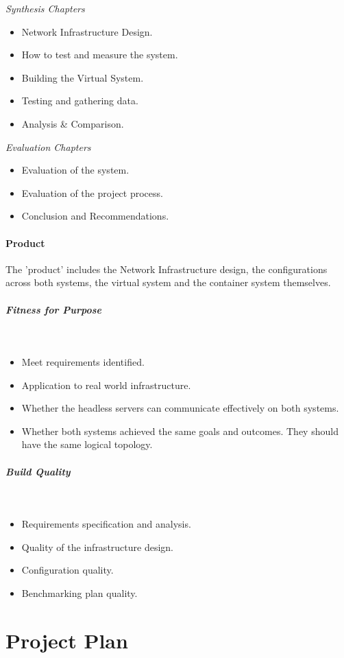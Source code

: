 \emph{Synthesis Chapters}
\begin{itemize}
	\item Network Infrastructure Design.
	\item How to test and measure the system.
	\item Building the Virtual System.
	\item Testing and gathering data.
	\item Analysis \& Comparison.
\end{itemize}

\emph{Evaluation Chapters}
\begin{itemize}
	\item Evaluation of the system.
	\item Evaluation of the project process.
	\item Conclusion and Recommendations.
\end{itemize}

\paragraph{Product} The 'product' includes the Network Infrastructure design, the configurations across both systems, the virtual system and the container system themselves.



\subparagraph{Fitness for Purpose}~
\begin{itemize}
	\item Meet requirements identified.
	\item Application to real world infrastructure.
	\item Whether the headless servers can communicate effectively on both systems.
	\item Whether both systems achieved the same goals and outcomes. They should have the same logical topology.
\end{itemize}

\subparagraph{Build Quality}~
\begin{itemize}
	\item Requirements specification and analysis.
	\item Quality of the infrastructure design.
	\item Configuration quality.
	\item Benchmarking plan quality.
\end{itemize}

\clearpage

\section{Project Plan}
\noindent
{}
